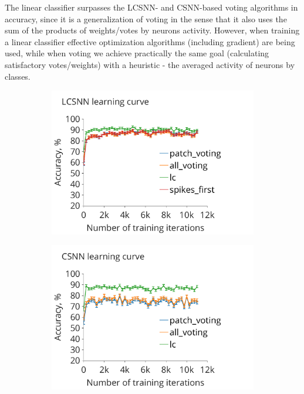 \documentclass[a4paper,10pt]{article}
\begin{document}
The linear classifier surpasses the LCSNN- and CSNN-based voting algorithms in accuracy, since it is a generalization of voting in the sense that it also uses the sum of the products of weights/votes by neurons activity. However, when training a linear classifier effective optimization algorithms (including gradient) are being used, while when voting we achieve practically the same goal (calculating satisfactory votes/weights) with a heuristic - the averaged activity of neurons by classes.

\begin{figure}
\centering
\begin{subfigure}{0.48\textwidth}
    \includegraphics[width=\textwidth,keepaspectratio=true]{LCSNN_learning_rate.pdf}
 \caption{}
 \label{LCSNN_learning_curve}
\end{subfigure} 
\begin{subfigure}{0.48\textwidth} 
    \includegraphics[width=\textwidth,keepaspectratio=true]{CSNN_learning_rate.pdf}
 \caption{}
 \label{CSNN_learning_curve}
\end{subfigure} 
\end{figure}
\end{document}
